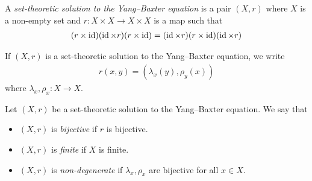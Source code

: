     \begin{definition}
        A \emph{set-theoretic solution to the Yang--Baxter equation} is a pair $(X,r)$ where $X$ is a non-empty set and $r: X\times X \to X \times X$ is a map such that
        \begin{align}\label{eq:YBE}
            (r\times \operatorname{id})(\operatorname{id} \times r)(r\times \operatorname{id}) = (\operatorname{id} \times r)(r\times \operatorname{id})(\operatorname{id} \times r)
        \end{align}
    \end{definition}
    
    \begin{convention}
        If $(X,r)$ is a set-theoretic solution to the Yang--Baxter equation, we write 
        \begin{align*}
            r(x,y) = (\lambda_x(y),\rho_y(x))        
        \end{align*}
        where $\lambda_x,\rho_x:X\to X$.
    \end{convention}


    \begin{definition}
        Let $(X,r)$ be a set-theoretic solution to the  Yang--Baxter equation. We say that 
        \begin{itemize}
            \item $(X,r)$ is \emph{bijective} if $r$ is bijective.
            \item $(X,r)$ is \emph{finite} if $X$ is finite.
            \item $(X,r)$ is \emph{non-degenerate} if $\lambda_x,\rho_x$ are bijective for all $x\in X$.
        \end{itemize}
    \end{definition}



